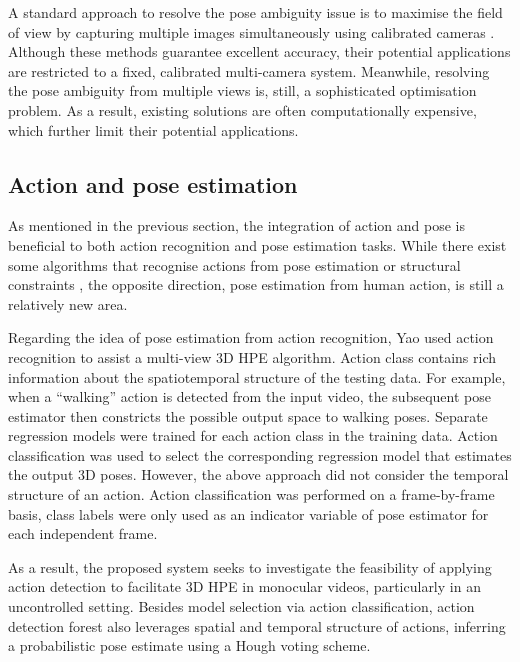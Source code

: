 A standard approach to resolve the pose ambiguity issue is to maximise the field of view by capturing multiple images simultaneously using calibrated cameras \cite{Pons-Moll2011, Sigal2012, Yao2012}.   
Although these methods guarantee excellent accuracy, their potential applications are restricted to a fixed, calibrated multi-camera system. 
Meanwhile, resolving the pose ambiguity from multiple views is, still, a sophisticated optimisation problem. 
As a result, existing solutions are often computationally expensive, which further limit their potential applications.   

\subsection{Action and pose estimation}

As mentioned in the previous section, the integration of action and pose is beneficial to both action recognition and pose estimation tasks. 
While there exist some algorithms that recognise actions from pose estimation or structural constraints \cite{Yu2010, Raja2011}, the opposite direction, \ie pose estimation from human action, is still a relatively new area. 

Regarding the idea of pose estimation from action recognition, Yao \etal \cite{Yao2012} used action recognition to assist a multi-view 3D HPE algorithm. 
Action class contains rich information about the spatiotemporal structure of the testing data. For example, when a ``walking'' action is detected from the input video, the subsequent pose estimator then constricts the possible output space to walking poses.   
Separate regression models were trained for each action class in the training data. 
Action classification was used to select the corresponding regression model that estimates the output 3D poses. 
However, the above approach did not consider the temporal structure of an action.    
Action classification was performed on a frame-by-frame basis, class labels were only used as an indicator variable of pose estimator for each independent frame. 

As a result, the proposed system seeks to investigate the feasibility of applying action detection to facilitate 3D HPE in monocular videos, particularly in an uncontrolled setting. 
Besides model selection via action classification, action detection forest also leverages spatial and temporal structure of actions, inferring a probabilistic pose estimate using a Hough voting scheme.  

